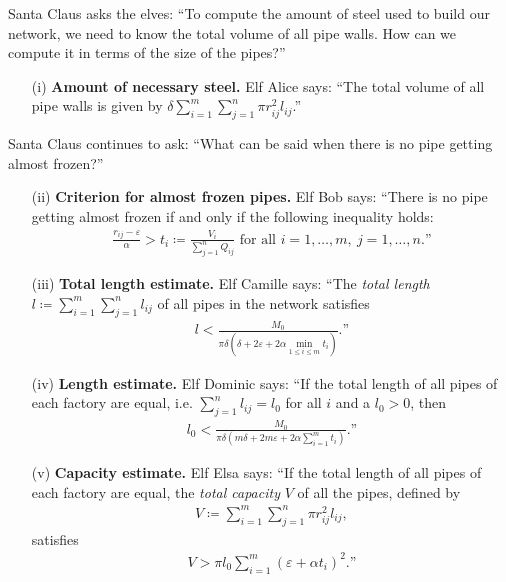 \documentclass[12pt]{article}
\begin{document}
Santa Claus asks the elves: ``To compute the amount of steel used to build our network, we need to know the total volume of all pipe walls. How can we compute it in terms of the size of the pipes?''

\begin{itemize}
    \item[(i)] \textbf{Amount of necessary steel.} Elf Alice says: ``The total volume of all pipe walls is given by  $\delta\sum_{i=1}^m\sum_{j=1}^n \pi r_{ij}^2l_{ij}$.''
\end{itemize}
Santa Claus continues to ask: ``What can be said when there is no pipe getting almost frozen?''
\begin{itemize}
    \item[(ii)] \textbf{Criterion for almost frozen pipes.} Elf Bob says: ``There is no pipe getting almost frozen if and only if the following inequality holds:
    \begin{align*}
    \frac{r_{ij} - \varepsilon}{\alpha} > t_i\coloneqq\frac{V_i}{\sum_{j=1}^n Q_{ij}} \mbox{ for all } i = 1,\ldots,m,\ j = 1,\ldots,n.\mbox{''}
    \end{align*}
    \item[(iii)] \textbf{Total length estimate.} Elf Camille says: ``The \textit{total length} $l \coloneqq \sum_{i=1}^m\sum_{j=1}^n l_{ij}$ of all pipes in the network satisfies
    \begin{align*}
    l < \frac{M_0}{\pi\delta\left(\delta + 2\varepsilon + 2\alpha\min_{1\le i\le m} t_i\right)}.\mbox{''}
    \end{align*}
    \item[(iv)] \textbf{Length estimate.} Elf Dominic says: ``If the total length of all pipes of each factory are equal, i.e. $\sum_{j=1}^n l_{ij}= l_0$ for all $i$ and a $l_0>0$, then
    \begin{align*}
    l_0 < \frac{M_0}{\pi\delta\left(m\delta + 2m\varepsilon + 2\alpha\sum_{i=1}^m t_i\right)}.\mbox{''}
    \end{align*}
    \item[(v)] \textbf{Capacity estimate.} Elf Elsa says: ``If the total length of all pipes of each factory are equal, the \textit{total capacity} $V$ of all the pipes, defined by
    \begin{align}
    V \coloneqq \sum_{i=1}^m\sum_{j=1}^n \pi r_{ij}^2l_{ij},\label{V}\tag{V}
    \end{align}
    satisfies 
    \begin{align*}
    V > \pi l_0\sum_{i=1}^m (\varepsilon + \alpha t_i)^2.\mbox{''}
    \end{align*}
\end{itemize}
\end{document}
